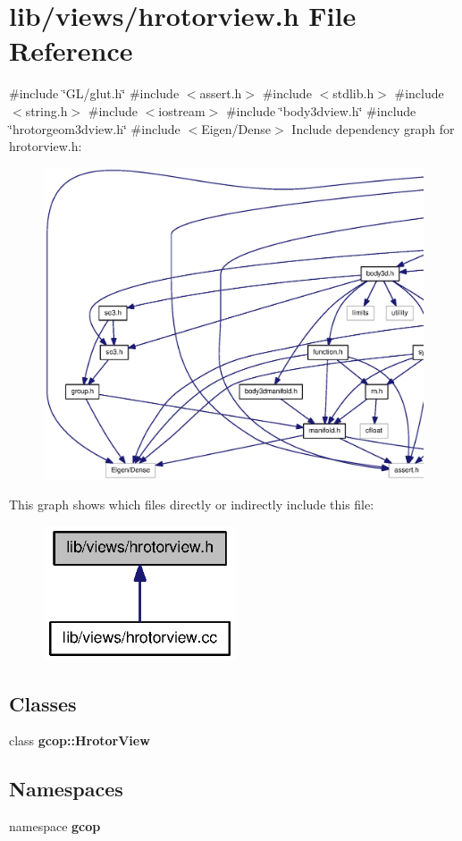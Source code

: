 \section{lib/views/hrotorview.h \-File \-Reference}
\label{hrotorview_8h}
{\ttfamily \#include \char`\"{}\-G\-L/glut.\-h\char`\"{}}\*
{\ttfamily \#include $<$assert.\-h$>$}\*
{\ttfamily \#include $<$stdlib.\-h$>$}\*
{\ttfamily \#include $<$string.\-h$>$}\*
{\ttfamily \#include $<$iostream$>$}\*
{\ttfamily \#include \char`\"{}body3dview.\-h\char`\"{}}\*
{\ttfamily \#include \char`\"{}hrotorgeom3dview.\-h\char`\"{}}\*
{\ttfamily \#include $<$\-Eigen/\-Dense$>$}\*
\-Include dependency graph for hrotorview.\-h\-:
\nopagebreak
\begin{figure}[H]
\begin{center}
\leavevmode
\includegraphics[width=350pt]{hrotorview_8h__incl}
\end{center}
\end{figure}
\-This graph shows which files directly or indirectly include this file\-:
\nopagebreak
\begin{figure}[H]
\begin{center}
\leavevmode
\includegraphics[width=160pt]{hrotorview_8h__dep__incl}
\end{center}
\end{figure}
\subsection*{\-Classes}
\begin{DoxyCompactItemize}
\item 
class {\bf gcop\-::\-Hrotor\-View}
\end{DoxyCompactItemize}
\subsection*{\-Namespaces}
\begin{DoxyCompactItemize}
\item 
namespace {\bf gcop}
\end{DoxyCompactItemize}
